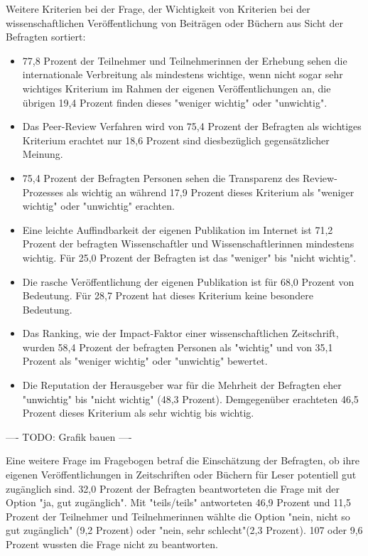 Weitere Kriterien bei der Frage, der Wichtigkeit von Kriterien bei der wissenschaftlichen Veröffentlichung von Beiträgen oder Büchern aus Sicht der Befragten sortiert:
\begin{itemize}
\item 77,8 Prozent der Teilnehmer und Teilnehmerinnen der Erhebung sehen die internationale Verbreitung als mindestens wichtige, wenn nicht sogar sehr wichtiges Kriterium im Rahmen der eigenen Veröffentlichungen an, die übrigen 19,4 Prozent finden dieses "weniger wichtig" oder "unwichtig".
\item Das Peer-Review Verfahren wird von 75,4 Prozent der Befragten als wichtiges Kriterium erachtet nur 18,6 Prozent sind diesbezüglich gegensätzlicher Meinung.
\item 75,4 Prozent der Befragten Personen sehen die Transparenz des Review-Prozesses als wichtig an während 17,9 Prozent dieses Kriterium als "weniger wichtig" oder "unwichtig" erachten.
\item Eine leichte Auffindbarkeit der eigenen Publikation im Internet ist 71,2 Prozent der befragten Wissenschaftler und Wissenschaftlerinnen mindestens wichtig. Für 25,0 Prozent der Befragten ist das "weniger" bis "nicht wichtig".
\item Die rasche Veröffentlichung der eigenen Publikation ist für 68,0 Prozent von Bedeutung. Für 28,7 Prozent hat dieses Kriterium keine besondere Bedeutung.
\item Das Ranking, wie der Impact-Faktor einer wissenschaftlichen Zeitschrift, wurden 58,4 Prozent der befragten Personen als "wichtig" und von 35,1 Prozent als "weniger wichtig" oder "unwichtig" bewertet.
\item Die Reputation der Herausgeber war für die Mehrheit der Befragten eher "unwichtig" bis "nicht wichtig" (48,3 Prozent). Demgegenüber erachteten 46,5 Prozent dieses Kriterium als sehr wichtig bis wichtig.
\end{itemize}

---- TODO: Grafik bauen ----

Eine weitere Frage im Fragebogen betraf die Einschätzung der Befragten, ob ihre eigenen Veröffentlichungen in Zeitschriften oder Büchern für Leser potentiell gut zugänglich sind. 32,0 Prozent der Befragten beantworteten die Frage mit der Option "ja, gut zugänglich". Mit "teils/teils" antworteten 46,9 Prozent und 11,5 Prozent der Teilnehmer und Teilnehmerinnen wählte die Option "nein, nicht so gut zugänglich" (9,2 Prozent) oder "nein, sehr schlecht"(2,3 Prozent). 107 oder 9,6 Prozent wussten die Frage nicht zu beantworten.

